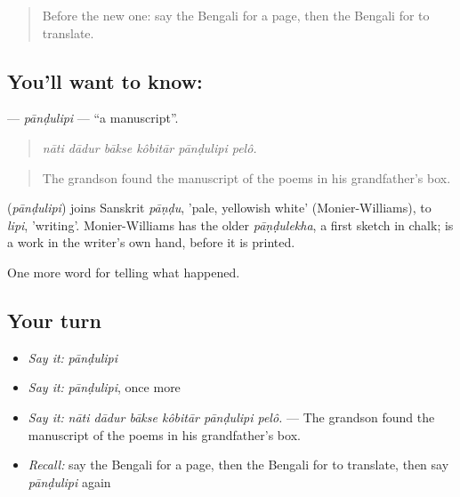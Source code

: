 \label{lesson:BN-C328-pandulipi}



\begin{quote}
Before the new one: say the Bengali for a page, then the Bengali for to translate.
\end{quote}

\subsection*{You'll want to know: }
\textbf{} — \emph{pānḍulipi} — \textquotedblleft{}a manuscript\textquotedblright{}.

\begin{quote}
     
\end{quote}

\begin{quote}
\emph{nāti dādur bākse kôbitār pānḍulipi pelô.}
\end{quote}

\begin{quote}
The grandson found the manuscript of the poems in his grandfather's box.
\end{quote}

\begin{cousinweb}
\textbf{} (\emph{pānḍulipi}) joins Sanskrit \emph{pāṇḍu}, 'pale, yellowish white' (Monier-Williams), to \emph{lipi}, 'writing'. Monier-Williams has the older \emph{pāṇḍulekha}, a first sketch in chalk;  is a work in the writer's own hand, before it is printed.
\end{cousinweb}

\begin{grammarlens}[title={What you've built}]
One more word for telling what happened.
\end{grammarlens}

\subsection*{Your turn}
\begin{itemize}
\raggedright
  \item \emph{Say it:} \emph{pānḍulipi}
  \item \emph{Say it:} \emph{pānḍulipi}, once more
  \item \emph{Say it:} \emph{nāti dādur bākse kôbitār pānḍulipi pelô.} — The grandson found the manuscript of the poems in his grandfather's box.
  \item \emph{Recall:} say the Bengali for a page, then the Bengali for to translate, then say \emph{pānḍulipi} again
\end{itemize}

